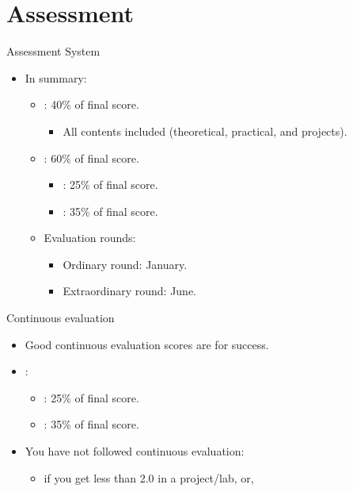 \section{Assessment}

\begin{frame}[t]{Assessment System}
\begin{itemize}
  \item In summary:
    \begin{itemize}
      \item {}: 40\% of final score.
        \begin{itemize}
          \item All contents included (theoretical, practical, and projects).
        \end{itemize}

      \item {}: 60\% of final score.
        \begin{itemize}
          \item {}: 25\% of final score.
          \item {}: 35\% of final score.
        \end{itemize}

    \item Evaluation rounds:
      \begin{itemize}
        \item Ordinary round: January.
        \item Extraordinary round: June.
      \end{itemize}
  \end{itemize}
\end{itemize}
\end{frame}

\begin{frame}[t]{Continuous evaluation}
\begin{itemize}
  \item Good continuous evaluation scores are  for success.

  \item {}:
    \begin{itemize}
      \item {}: 25\% of final score.
      \item {}: 35\% of final score.
    \end{itemize}
  \vspace{1em}

  \item You \alert{have not followed} continuous evaluation:
    \begin{itemize}
      \item if you get less than 2.0 in a project/lab, or,
    \end{itemize}
\end{itemize}
\end{frame}

